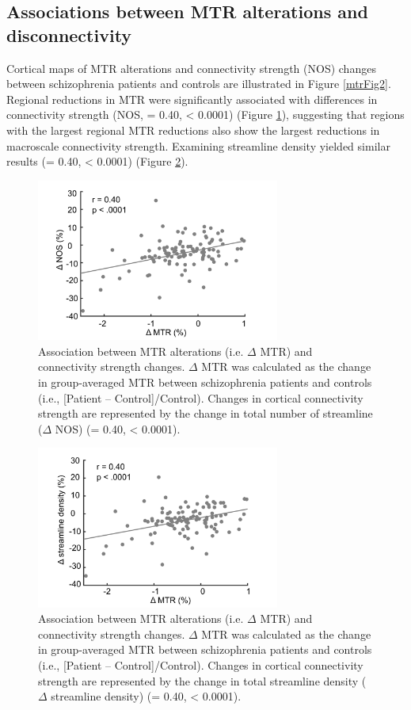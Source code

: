 \begin{refsection}
\subsection*{Associations between MTR alterations and disconnectivity}
Cortical maps of MTR alterations and connectivity strength (NOS) changes between schizophrenia patients and controls are illustrated in Figure \ref{mtrFig2}. Regional reductions in MTR were significantly associated with differences in connectivity strength (NOS, \rval = 0.40, \pval < 0.0001) (Figure \ref{mtrFig3}), suggesting that regions with the largest regional MTR reductions also show the largest reductions in macroscale connectivity strength. Examining streamline density yielded similar results (\rval = 0.40, \pval < 0.0001) (Figure \ref{mtrFig4}).

\begin{figure}[h]
    \centering
    \includegraphics[width=8cm]{images/mtrFig3.jpg}
    \caption{Association between MTR alterations (i.e. $\Delta$ MTR) and connectivity strength changes. $\Delta$ MTR was calculated as the change in group-averaged MTR between schizophrenia patients and controls (i.e., {[}Patient – Control{]}/Control). Changes in cortical connectivity strength are represented by the change in total number of streamline ($\Delta$ NOS) (\rval = 0.40, \pval < 0.0001).}
    \label{mtrFig3}
\end{figure}

\begin{figure}[h]
    \centering
    \includegraphics[width=8cm]{images/mtrFig4.jpg}
    \caption{Association between MTR alterations (i.e. $\Delta$ MTR) and connectivity strength changes. $\Delta$ MTR was calculated as the change in group-averaged MTR between schizophrenia patients and controls (i.e., {[}Patient – Control{]}/Control). Changes in cortical connectivity strength are represented by the change in total streamline density ($\Delta$ streamline density) (\rval = 0.40, \pval < 0.0001).}
    \label{mtrFig4}
\end{figure}


\end{refsection}
